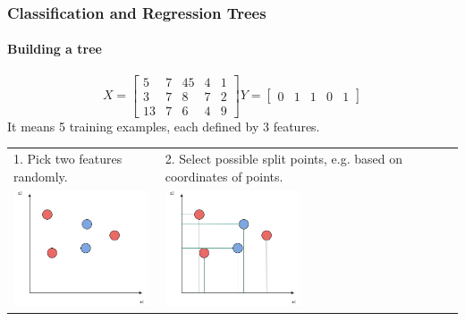 \begin{frame}
	\frametitle{Classification and Regression Trees}
		\framesubtitle{Building a tree}
		\[
		X=
		\left[ {\begin{array}{ccccc}
		5 & 7 & 45 & 4 & 1\\
		3 & 7 & 8 & 7 & 2\\
		13 & 7 & 6 & 4 & 9
		\end{array} } \right]
		Y=
		\left[ {\begin{array}{ccccc}
		0 & 1 & 1 & 0 & 1
		\end{array} } \right]
		\] 
		It means 5 training examples, each defined by 3 features.
		\begin{center}
		\begin{tabular}{m{5cm} m{5cm}}
		1. Pick two features randomly.
		&
		2. Select possible split points, e.g. based on coordinates of points. \\
		\includegraphics[width=4cm]{./figures/macierz1}
		&
		\includegraphics[width=4cm]{./figures/macierz2}
		\\
		\end{tabular}
		\end{center}
		
\end{frame}

